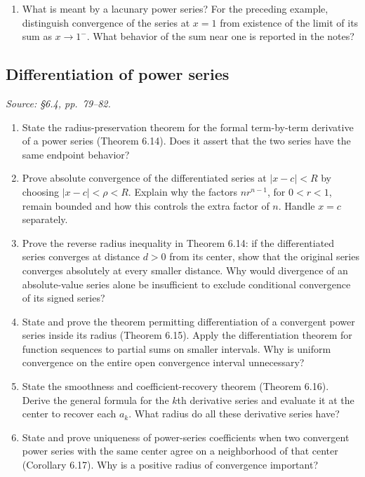 \begin{enumerate}[resume]
  \item What is meant by a lacunary power series?
    For the preceding example, distinguish convergence of the series
    at \(x=1\) from existence of the limit of its sum as \(x\to1^-\).
    What behavior of the sum near one is reported in the notes?
\end{enumerate}

\subsection{Differentiation of power series}
\textit{Source: \S6.4, pp.~79--82.}

\begin{enumerate}[resume]
  \item State the radius-preservation theorem for the formal
    term-by-term derivative of a power series (Theorem 6.14).
    Does it assert that the two series have the same endpoint behavior?

  \item Prove absolute convergence of the differentiated series at
    \(|x-c|<R\) by choosing \(|x-c|<\rho<R\).
    Explain why the factors \(nr^{n-1}\), for \(0<r<1\),
    remain bounded and how this controls the extra factor of \(n\).
    Handle \(x=c\) separately.

  \item Prove the reverse radius inequality in Theorem 6.14:
    if the differentiated series converges at distance \(d>0\)
    from its center, show that the original series converges
    absolutely at every smaller distance. Why would divergence of
    an absolute-value series alone be insufficient to exclude
    conditional convergence of its signed series?

  \item State and prove the theorem permitting differentiation of
    a convergent power series inside its radius (Theorem 6.15).
    Apply the differentiation theorem for function sequences to
    partial sums on smaller intervals. Why is uniform convergence
    on the entire open convergence interval unnecessary?

  \item State the smoothness and coefficient-recovery theorem
    (Theorem 6.16). Derive the general formula for the \(k\)th
    derivative series and evaluate it at the center to recover
    each \(a_k\). What radius do all these derivative series have?

  \item State and prove uniqueness of power-series coefficients
    when two convergent power series with the same center agree
    on a neighborhood of that center (Corollary 6.17).
    Why is a positive radius of convergence important?
\end{enumerate}

